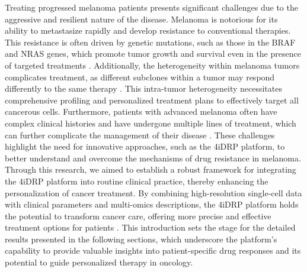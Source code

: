 Treating progressed melanoma patients presents significant challenges due to the aggressive and resilient nature of the disease.
Melanoma is notorious for its ability to metastasize rapidly and develop resistance to conventional therapies.
This resistance is often driven by genetic mutations, such as those in the BRAF and NRAS genes, which promote tumor growth and survival even in the presence of targeted treatments \cite{}.
Additionally, the heterogeneity within melanoma tumors complicates treatment, as different subclones within a tumor may respond differently to the same therapy \cite{}.
This intra-tumor heterogeneity necessitates comprehensive profiling and personalized treatment plans to effectively target all cancerous cells.
Furthermore, patients with advanced melanoma often have complex clinical histories and have undergone multiple lines of treatment, which can further complicate the management of their disease \cite{}.
These challenges highlight the need for innovative approaches, such as the 4iDRP platform, to better understand and overcome the mechanisms of drug resistance in melanoma.
Through this research, we aimed to establish a robust framework for integrating the 4iDRP platform into routine clinical practice, thereby enhancing the personalization of cancer treatment.
By combining high-resolution single-cell data with clinical parameters and multi-omics descriptions, the 4iDRP platform holds the potential to transform cancer care, offering more precise and effective treatment options for patients \cite{}.
This introduction sets the stage for the detailed results presented in the following sections, which underscore the platform's capability to provide valuable insights into patient-specific drug responses and its potential to guide personalized therapy in oncology.

